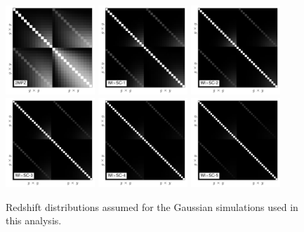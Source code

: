 \documentclass[useAMS,usenatbib]{mn2e}
\begin{document}
  \begin{figure}
    \centering
    \includegraphics[width=0.3\textwidth]{cov_2mpz.pdf}
    \includegraphics[width=0.3\textwidth]{cov_wisc1.pdf}
    \includegraphics[width=0.3\textwidth]{cov_wisc2.pdf}
    \includegraphics[width=0.3\textwidth]{cov_wisc3.pdf}
    \includegraphics[width=0.3\textwidth]{cov_wisc4.pdf}
    \includegraphics[width=0.3\textwidth]{cov_wisc5.pdf}
    \caption{Redshift distributions assumed for the Gaussian simulations used in this analysis.}
    \label{fig:covs}
  \end{figure}
\end{document}
